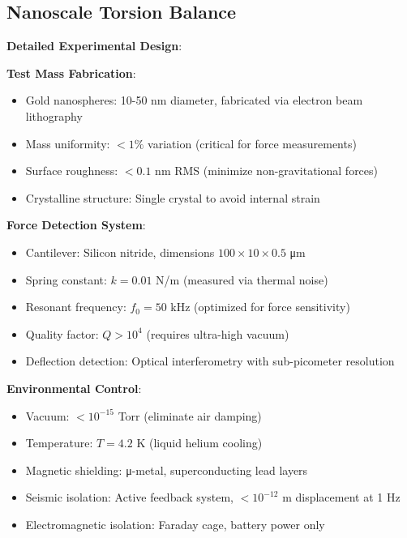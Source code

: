 \documentclass[12pt]{article}
\begin{document}
\subsection{Nanoscale Torsion Balance}

\textbf{Detailed Experimental Design}:

\textbf{Test Mass Fabrication}:
\begin{itemize}
\item Gold nanospheres: 10-50 nm diameter, fabricated via electron beam lithography
\item Mass uniformity: $< 1\%$ variation (critical for force measurements)
\item Surface roughness: $< 0.1$ nm RMS (minimize non-gravitational forces)
\item Crystalline structure: Single crystal to avoid internal strain
\end{itemize}

\textbf{Force Detection System}:
\begin{itemize}
\item Cantilever: Silicon nitride, dimensions $100 \times 10 \times 0.5$ μm
\item Spring constant: $k = 0.01$ N/m (measured via thermal noise)
\item Resonant frequency: $f_0 = 50$ kHz (optimized for force sensitivity)
\item Quality factor: $Q > 10^4$ (requires ultra-high vacuum)
\item Deflection detection: Optical interferometry with sub-picometer resolution
\end{itemize}

\textbf{Environmental Control}:
\begin{itemize}
\item Vacuum: $< 10^{-15}$ Torr (eliminate air damping)
\item Temperature: $T = 4.2$ K (liquid helium cooling)
\item Magnetic shielding: μ-metal, superconducting lead layers
\item Seismic isolation: Active feedback system, $< 10^{-12}$ m displacement at 1 Hz
\item Electromagnetic isolation: Faraday cage, battery power only
\end{itemize}
\end{document}
